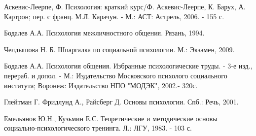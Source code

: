 
\begin{thebibliography}{1}
	
	
	Аскевис-Леерпе, Ф. Психология: краткий курс/Ф. Аскевис-Леерпе, К. Барух, А. Картрон; пер. с франц. М.Л. Карачун. - М.: АСТ: Астрель, 2006. - 155 с.
	
	Бодалев А.А. Психология межличностного общения. Рязань, 1994.
	
	Челдышова Н. Б. Шпаргалка по социальной психологии. М.: Экзамен, 2009.
	
	Бодалев А.А. Психология общения. Избранные психологические труды. - 3-е изд., перераб. и допол. - М.: Издательство Московского психолого социального института; Воронеж: Издательство НПО "МОДЭК", 2002.- 320с.
	
	
	
	
	Глейтман Г. Фридлунд А., Райсберг Д. Основы психологии. Спб.: Речь, 2001.
	
	
	
	
	Емельянов Ю.Н., Кузьмин Е.С. Теоретические и методические основы социально-психологического тренинга. Л.: ЛГУ, 1983. - 103 с.
	
	

\end{thebibliography}
